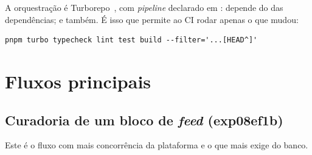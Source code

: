 A orquestração é Turborepo~\cite{turborepo2026}, com \emph{pipeline} declarado
em :  depende do  das dependências;
 e  também. É isso que permite ao CI rodar apenas o que
mudou:

\begin{lstlisting}[language=bashunoo, caption={O comando que o CI executa}]
pnpm turbo typecheck lint test build --filter='...[HEAD^]'
\end{lstlisting}

\section{Fluxos principais}
\label{sec:fluxos}

\subsection{Curadoria de um bloco de \emph{feed} (exp08ef1b)}

Este é o fluxo com mais concorrência da plataforma e o que mais exige do banco.

